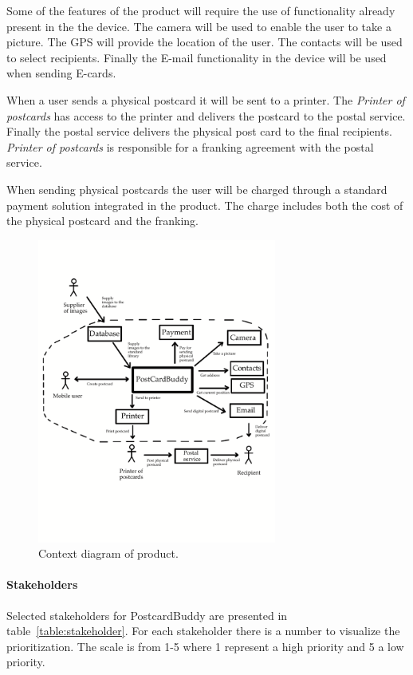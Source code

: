 \documentclass[10pt,a4paper]{article}
\begin{document}
Some of the features of the product will require the use of functionality already present in the the device. The camera will be used to enable the user to take a picture. The GPS will provide the location of the user. The contacts will be used to select recipients. Finally the E-mail functionality in the device will be used when sending E-cards.
 
When a user sends a physical postcard it will be sent to a printer. The  \textit{Printer of postcards} has access to the printer and delivers the postcard to the postal service.  Finally the postal service delivers the physical post card to the final recipients. \textit{Printer of postcards} is responsible for a franking agreement with the postal service.

When sending physical postcards the user will be charged through a standard payment solution integrated in the product. The charge includes both the cost of the physical postcard and the franking. 

\begin{figure}[h!]
\centering
\includegraphics[width=0.7\textwidth]{ContextDiagram4.pdf}
\caption{Context diagram of product.}
\label{fig:context}
\end{figure}
\FloatBarrier

\paragraph{Stakeholders}
Selected stakeholders for PostcardBuddy are presented in table~\ref{table:stakeholder}. For each stakeholder there is a number to visualize the prioritization. The scale is from 1-5 where 1 represent a high priority and 5 a low priority.
\end{document}

